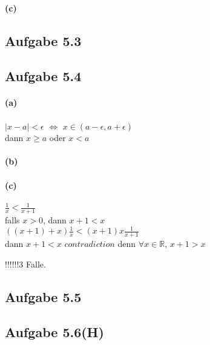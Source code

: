 \paragraph{(c)}

\newpage

\subsection{Aufgabe 5.3}

\newpage

\subsection{Aufgabe 5.4}

\paragraph{(a)}
$|x-a|<\epsilon$ $\Leftrightarrow$ $x\in(a-\epsilon,a+\epsilon)$\\

dann $x\geq a$ oder $x<a$

\paragraph{(b)}

\paragraph{(c)}
$\frac{1}{x}<\frac{1}{x+1}$\\

falls $x>0$, dann $x+1<x$\\

$((x+1)+x)\frac{1}{x}<(x+1)x\frac{1}{x+1}$\\

dann $x+1<x$ $contradiction$ denn $\forall x\in\mathbb{R}$, $x+1>x$

!!!!!!3 Falle.

\subsection{Aufgabe 5.5}

\newpage

\subsection{Aufgabe 5.6(H)}

